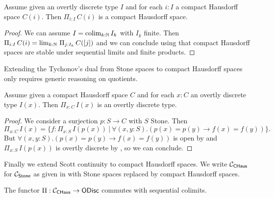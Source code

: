 \begin{proposition}[Tychonov]
Assume given an overtly discrete type $I$ and for each $i:I$ a compact Hausdorff space $C(i)$. Then $\Pi_{i:I}\,C(i)$ is a compact Hausdorff space.
\end{proposition}

\begin{proof}
We can assume $I = \mathrm{colim}_{k:\mathbb{N}}\,I_k$ with $I_k$ finite. Then $\Pi_{i:I}\,C(i) = \lim_{k:\mathbb{N}}\, \Pi_{j:I_k}\,C([j])$
and we can conclude using that compact Hausdorff spaces are stable under sequential limits and finite products.
\end{proof}

Extending the Tychonov's dual from Stone spaces to compact Hausdorff spaces only requires generic reasoning on quotients.

\begin{proposition}
Assume given a compact Hausdorff space $C$ and for each $x:C$ an overtly discrete type $I(x)$. Then $\Pi_{x:C}\,I(x)$ is an overtly discrete type.
\end{proposition}

\begin{proof}
We consider a surjection $p:S\to C$ with $S$ Stone. Then
\[\Pi_{x:C}\,I(x) = \{f:\Pi_{x:S}\,I(p(x))\ |\ \forall(x,y:S).(p(x)=p(y)\to f(x)=f(y))\}.\]
But $\forall(x,y:S).(p(x)=p(y)\to f(x)=f(y))$ is open by  and $\Pi_{x:S}\,I(p(x))$ is overtly discrete by , so we can conclude.
\end{proof}

Finally we extend Scott continuity to compact Hausdorff spaces. We write ${\mathcal C}_{\mathsf{CHaus}}$ for ${\mathcal C}_{\mathsf{Stone}}$ as given in  with Stone spaces replaced by compact Hausdorff spaces. 

\begin{theorem}\label{scott-continuity-chaus}
The functor $\Pi : {\mathcal C}_{\mathsf{CHaus}} \to \mathsf{ODisc}$ commutes with sequential colimits.
\end{theorem}

